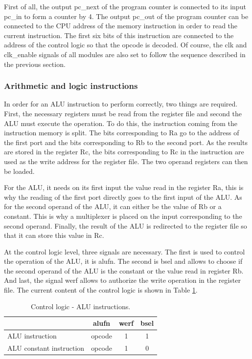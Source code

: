 First of all, the output pc\_next of the program counter is connected to its input pc\_in to form a 
counter by 4. The output pc\_out of the program counter can be connected to the CPU address of the 
memory instruction in order to read the current instruction. The first six bits of this instruction 
are connected to the address of the control logic so that the opcode is decoded. Of course, the clk 
and clk\_enable signals of all modules are also set to follow the sequence described in the previous 
section.

\subsubsection*{Arithmetic and logic instructions}

In order for an ALU instruction to perform correctly, two things are required. First, the 
necessary registers must be read from the register file and second the ALU must execute the operation. 
To do this, the instruction coming from the instruction memory is split. The bits corresponding to 
Ra go to the address of the first port and the bits corresponding to Rb to the second port. As the 
results are stored in the register Rc, the bits corresponding to Rc in the instruction are 
used as the write address for the register file. The two operand registers can then be loaded. 

For the ALU, it needs on its first input the value read in the register Ra, this is why the reading 
of the first port directly goes to the first input of the ALU. As for the second operand of the ALU, 
it can either be the value of Rb or a constant. This is why a multiplexer is placed on the input 
corresponding to the second operand. Finally, the result of the ALU is redirected to the register 
file so that it can store this value in Rc.

At the control logic level, three signals are necessary. The first is used to control the operation 
of the ALU, it is alufn. The second is bsel and allows to choose if the second operand of the ALU 
is the constant or the value read in register Rb. And last, the signal werf allows to 
authorize the write operation in the register file. The current content of the control logic is 
shown in Table \ref{tab:cl/alu}.

\begin{table}[H]
    \centering
    \begin{tabular}{|l|c|c|c|}
    \hline
    \rowcolor[HTML]{DAE8FC} 
    \multicolumn{1}{|c|}{\cellcolor[HTML]{DAE8FC}\textbf{Instruction}} & \textbf{alufn} & \textbf{werf} & \textbf{bsel} \\ \hline
    ALU instruction                                                    & opcode         & 1             & 1             \\ \hline
    ALU constant instruction                                           & opcode         & 1             & 0             \\ \hline
    \end{tabular}
    \caption{Control logic - ALU instructions.}
    \label{tab:cl/alu}
\end{table}

